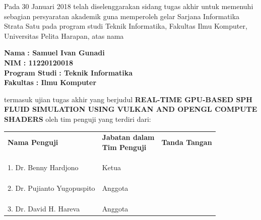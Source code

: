 \documentclass[a4paper, 12pt, oneside]{book}
\begin{document}
\begin{onehalfspace}
    \noindent Pada 30 Januari 2018 telah diselenggarakan sidang tugas akhir untuk memenuhi sebagian persyaratan akademik guna memperoleh gelar Sarjana Informatika Strata Satu pada program studi Teknik Informatika, Fakultas Ilmu Komputer, Universitas Pelita Harapan, atas nama
    
    \noindent \begin{tabbing}
    \hspace{3cm}\=\textbf{Nama} \hspace{2cm}\= \textbf{: Samuel Ivan Gunadi} \\
    \>\textbf{NIM} \> \textbf{: 11220120018} \\
    \>\textbf{Program Studi} \> \textbf{: Teknik Informatika} \\
    \>\textbf{Fakultas} \> \textbf{: Ilmu Komputer}
    \end{tabbing}
    
    \noindent termasuk ujian tugas akhir yang berjudul \textbf{\MakeTextUppercase{Real-Time GPU-Based SPH Fluid Simulation Using Vulkan and OpenGL Compute Shaders}} oleh tim penguji yang terdiri dari:
    
    \vspace{0.5cm}
    
    \noindent
    \begin{tabu} to 
        \textbf{Nama Penguji} & \textbf{Jabatan dalam \newline Tim Penguji} & \textbf{Tanda Tangan}     \\
        \\
        \\
        \\
        1. Dr. Benny Hardjono & Ketua & \hrulefill \\
        \\
        \\
        \\
        2. Dr. Pujianto Yugopuspito & Anggota & \hrulefill \\
        \\
        \\
        \\
        3. Dr. David H. Hareva & Anggota & \hrulefill \\
    \end{tabu}
    
    \vspace{0.5cm}

\end{onehalfspace}
\end{document}
